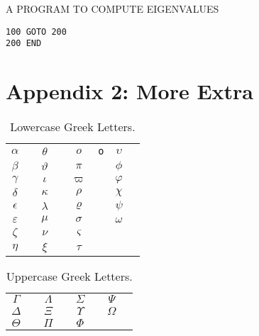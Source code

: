 \documentclass{report}
\begin{document}
\begin{center}
   {\Large A PROGRAM TO COMPUTE EIGENVALUES}
\end{center}

\begin{verbatim}    
100 GOTO 200
200 END
\end{verbatim}    

\chapter*{Appendix 2: More Extra}


%
%
\newcommand{\X}[1]{$#1$&\texttt{\string#1}\hspace*{1ex}}
\newsavebox{\symbbox}
\newenvironment{symbols}[1]%
{\par\vspace*{2ex}
\begin{lrbox}{\symbbox}
\hspace*{4ex}\begin{tabular}{@{}#1@{}}}%
{\end{tabular}\end{lrbox}\makebox[\textwidth]{\usebox{\symbbox}}\par\medskip}



\begin{table}[!h]
\caption{Lowercase Greek Letters.}
\begin{symbols}{*4{cl}}
 \X{\alpha}     & \X{\theta}     & \X{o}          & \X{\upsilon}  \\
 \X{\beta}      & \X{\vartheta}  & \X{\pi}        & \X{\phi}      \\
 \X{\gamma}     & \X{\iota}      & \X{\varpi}     & \X{\varphi}   \\
 \X{\delta}     & \X{\kappa}     & \X{\rho}       & \X{\chi}      \\
 \X{\epsilon}   & \X{\lambda}    & \X{\varrho}    & \X{\psi}      \\
 \X{\varepsilon}& \X{\mu}        & \X{\sigma}     & \X{\omega}    \\
 \X{\zeta}      & \X{\nu}        & \X{\varsigma}  & &             \\
 \X{\eta}       & \X{\xi}        & \X{\tau} 
\end{symbols}
\end{table}

\begin{table}[!h]
\caption{Uppercase Greek Letters.}
\begin{symbols}{*4{cl}}
 \X{\Gamma}     & \X{\Lambda}    & \X{\Sigma}     & \X{\Psi}      \\
 \X{\Delta}     & \X{\Xi}        & \X{\Upsilon}   & \X{\Omega}    \\
 \X{\Theta}     & \X{\Pi}        & \X{\Phi} 
\end{symbols}
\end{table}
\end{document}
